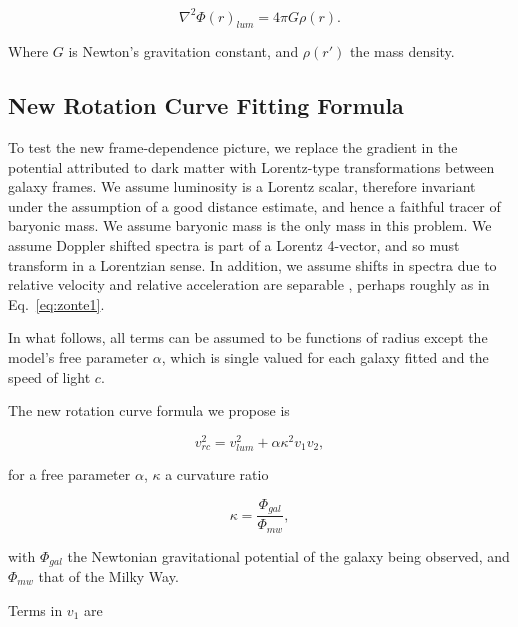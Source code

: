 \documentclass[reprint,%
 amsmath,amssymb,
 aps,
]{revtex4-1}
\begin{document}
\begin{equation}
\nabla^2 \Phi(r)_{lum}  = 4\pi G \rho(r).   
    \label{whatsgood}
\end{equation}

 Where $G$ is Newton's   gravitation constant, and 
$\rho(r')$  the mass density. 
  



\subsection{New Rotation Curve Fitting Formula}

  

 

 To test the   new 
frame-dependence picture, 
we  replace the gradient in the potential   attributed to   dark matter      with  Lorentz-type transformations between galaxy frames.   We    assume  luminosity   is a Lorentz scalar, therefore invariant under the assumption of a good distance estimate, and hence a faithful tracer of baryonic mass.  We assume baryonic mass is the only mass in this problem. 
We assume   
   Doppler shifted spectra is part of a Lorentz 4-vector, and so    must transform in a Lorentzian sense.
In addition, we 
   assume   shifts in   spectra   due to relative velocity and relative acceleration are separable \cite{Jack,Cisn}, perhaps roughly  as in Eq.~\ref{eq:zonte1}.
  
   
   
   In what follows, all   terms  can be assumed to  be functions of radius except the model's free parameter $\alpha$,  which is single valued for each galaxy fitted and the speed of light $c$. 
   
   The new rotation curve formula we propose  is
   

\begin{equation}
v_{rc}^2 =  v_{lum}^2+\alpha \kappa^2 v_{1} v_{2},  
\label{eq:zonteLCM}
\end{equation}  

for   a free parameter $\alpha$,  
$\kappa$  a curvature ratio 

 \begin{equation}
\kappa=\frac{\Phi_{gal}}{\Phi_{mw}}, 
\label{eq:kappa2}  
\end{equation}  

 with $\Phi_{gal}$ the    Newtonian gravitational potential of the galaxy being observed, and $\Phi_{mw}$ that of  the Milky Way. 


 Terms in $v_1$   are   
 
\end{document}
